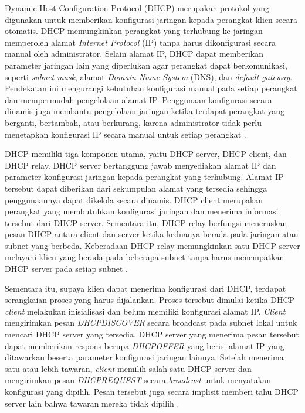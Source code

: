 Dynamic Host Configuration Protocol (DHCP) merupakan protokol yang digunakan untuk memberikan konfigurasi jaringan kepada perangkat klien secara otomatis. DHCP memungkinkan perangkat yang terhubung ke jaringan memperoleh alamat \textit{Internet Protocol} (IP) tanpa harus dikonfigurasi secara manual oleh administrator. Selain alamat IP, DHCP dapat memberikan parameter jaringan lain yang diperlukan agar perangkat dapat berkomunikasi, seperti \textit{subnet mask}, alamat \textit{Domain Name System} (DNS), dan \textit{default gateway}. Pendekatan ini mengurangi kebutuhan konfigurasi manual pada setiap perangkat dan mempermudah pengelolaan alamat IP. Penggunaan konfigurasi secara dinamis juga membantu pengelolaan jaringan ketika terdapat perangkat yang berganti, bertambah, atau berkurang, karena administrator tidak perlu menetapkan konfigurasi IP secara manual untuk setiap perangkat \parencite{FORTINET_DHCP}.

DHCP memiliki tiga komponen utama, yaitu DHCP server, DHCP client, dan DHCP relay. DHCP server bertanggung jawab menyediakan alamat IP dan parameter konfigurasi jaringan kepada perangkat yang terhubung. Alamat IP tersebut dapat diberikan dari sekumpulan alamat yang tersedia sehingga penggunaannya dapat dikelola secara dinamis. DHCP client merupakan perangkat yang membutuhkan konfigurasi jaringan dan menerima informasi tersebut dari DHCP server. Sementara itu, DHCP relay berfungsi meneruskan pesan DHCP antara client dan server ketika keduanya berada pada jaringan atau subnet yang berbeda. Keberadaan DHCP relay memungkinkan satu DHCP server melayani klien yang berada pada beberapa subnet tanpa harus menempatkan DHCP server pada setiap subnet \parencite{FORTINET_DHCP}.

Sementara itu, supaya klien dapat menerima konfigurasi dari DHCP, terdapat serangkaian proses yang harus dijalankan. Proses tersebut dimulai ketika DHCP \textit{client} melakukan inisialisasi dan belum memiliki konfigurasi alamat IP. \textit{Client} mengirimkan pesan \textit{DHCPDISCOVER} secara broadcast pada subnet lokal untuk mencari DHCP server yang tersedia. DHCP server yang menerima pesan tersebut dapat memberikan respons berupa \textit{DHCPOFFER} yang berisi alamat IP yang ditawarkan beserta parameter konfigurasi jaringan lainnya. Setelah menerima satu atau lebih tawaran, \textit{client} memilih salah satu DHCP server dan mengirimkan pesan \textit{DHCPREQUEST} secara \textit{broadcast} untuk menyatakan konfigurasi yang dipilih. Pesan tersebut juga secara implisit memberi tahu DHCP server lain bahwa tawaran mereka tidak dipilih \parencite{RFC2131}.

